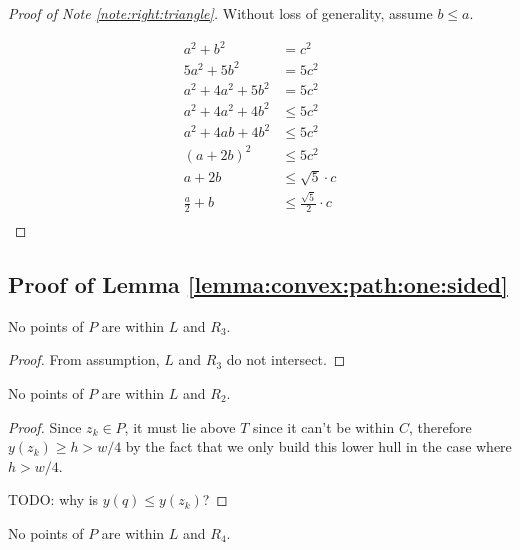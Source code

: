 \documentclass{tufte-handout}
\begin{document}
\begin{proof}[Proof of Note \ref{note:right:triangle}]
  Without loss of generality, assume $b \le a$.
  
  \begin{align*}
    a^2 + b^2 &= c^2 \\
    5a^2 + 5b^2 &= 5c^2 \\
    a^2 + 4a^2 + 5b^2 &= 5c^2 \\
    a^2 + 4a^2 + 4b^2 &\le 5c^2 \\
    a^2 + 4ab + 4b^2 &\le 5c^2 \\
    (a + 2b)^2 &\le 5c^2 \\
    a + 2b &\le \sqrt{5} \cdot c \\
    \frac{a}{2} + b &\le \frac{\sqrt{5}}{2} \cdot c \\
  \end{align*}
\end{proof}

\subsection{Proof of Lemma \ref{lemma:convex:path:one:sided}}

\begin{Note}

  No points of $P$ are within $L$ and $R_3$.
  
\end{Note}

\begin{proof}
  
  From assumption, $L$ and $R_3$ do not intersect.

\end{proof}

\begin{Note}

  No points of $P$ are within $L$ and $R_2$.
  
\end{Note}

\begin{proof}

  Since $z_k \in P$, it must lie above $T$ since it can't be within $C$,
  therefore $y(z_k) \ge h > w/4$ by the fact that we only build this
  lower hull in the case where $h > w/4$.

  TODO: why is $y(q) \le y(z_k)$?

\end{proof}

\begin{Note}

  No points of $P$ are within $L$ and $R_4$.
  
\end{Note}
\end{document}
